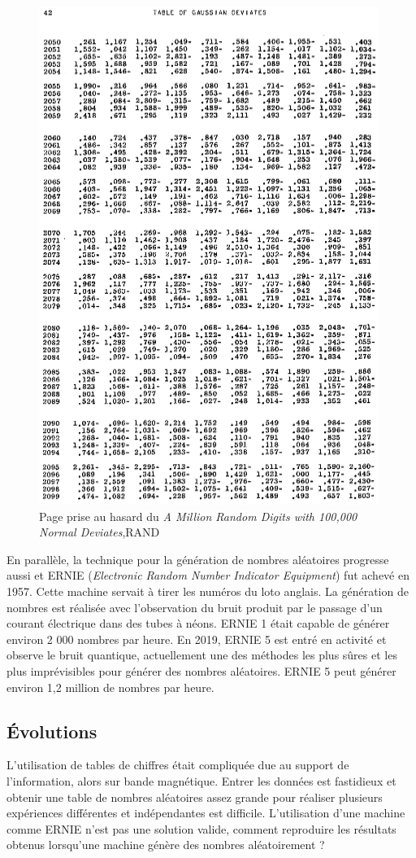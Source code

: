 \documentclass[9pt,a4paper,twoside,english]{class/backend}
\begin{document}
    \begin{figure}
        \centering
        \includegraphics[width=0.5\linewidth]{figures/page_du_RAND_1000000digits.png}
        \caption{Page prise au hasard du \textit{A Million Random Digits with 100,000 Normal Deviates},RAND}
        \label{fig:RAND_page}
    \end{figure}
    
    En parallèle, la technique pour la génération de nombres aléatoires progresse aussi et ERNIE (\textit{Electronic Random Number Indicator Equipment}) fut achevé en 1957. Cette machine servait à tirer les numéros du loto anglais. La génération de nombres est réalisée avec l'observation du bruit produit par le passage d'un courant électrique dans des tubes à néons. ERNIE 1 était capable de générer environ 2 000 nombres par heure. En 2019, ERNIE 5 est entré en activité et observe le bruit quantique, actuellement une des méthodes les plus sûres et les plus imprévisibles pour générer des nombres aléatoires. ERNIE 5 peut générer environ 1,2 million de nombres par heure. \cite{ERNIE}
        
    
    \subsection{Évolutions}\smallskip

    \hspace{10pt}L'utilisation de tables de chiffres était compliquée due au support de l'information, alors sur bande magnétique. Entrer les données est fastidieux et obtenir une table de nombres aléatoires assez grande pour réaliser plusieurs expériences différentes et indépendantes est difficile. L'utilisation d'une machine comme ERNIE n'est pas une solution valide, comment reproduire les résultats obtenus lorsqu'une machine génère des nombres aléatoirement ?
    
\end{document}
